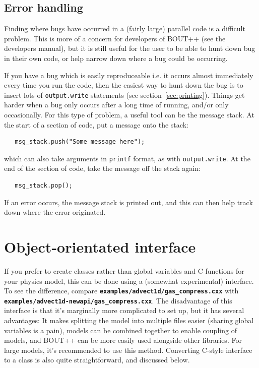 \documentclass[12pt]{article}
\newcommand{\code}[1]{\texttt{#1}}
\newcommand{\file}[1]{\texttt{\bf #1}}
\begin{document}
\subsection{Error handling}
%
Finding where bugs have occurred in a (fairly large) parallel code is a
difficult problem.  This is more of a concern for developers of BOUT++ (see the
developers manual), but it is still useful for the user to be able to hunt down
bug in their own code, or help narrow down where a bug could be occurring.

If you have a bug which is easily reproduceable i.e. it occurs almost
immediately every time you run the code, then the easiest way to hunt down the
bug is to insert lots of \code{output.write} statements (see
section~\ref{sec:printing}). Things get harder when a bug only occurs after a
long time of running, and/or only occasionally. For this type of problem, a
useful tool can be the message stack.  At the start of a section of code, put a
message onto the stack:
%
%
\begin{lstlisting}
   msg_stack.push("Some message here");
\end{lstlisting}
%
which can also take arguments in \code{printf} format, as with
\code{output.write}. At the end of the section of code, take the message off
the stack again:
%
\begin{lstlisting}
   msg_stack.pop();
\end{lstlisting}
%
If an error occurs, the message stack is printed out, and this can then help
track down where the error originated.





\section{Object-orientated interface}
%
\label{sec:newapi}
%
If you prefer to create classes rather than global variables and C functions
for your physics model, this can be done using a (somewhat experimental)
interface. To see the difference, compare
\file{examples/advect1d/gas\_compress.cxx} with\\
\file{examples/advect1d-newapi/gas\_compress.cxx}. The disadvantage of this
interface is that it's marginally more complicated to set up, but it has
several advantages: It makes splitting the model into multiple files easier
(sharing global variables is a pain), models can be combined together to enable
coupling of models, and BOUT++ can be more easily used alongside other
libraries.  For large models, it's recommended to use this method. Converting
C-style interface to a class is also quite straightforward, and discussed
below.
\end{document}
